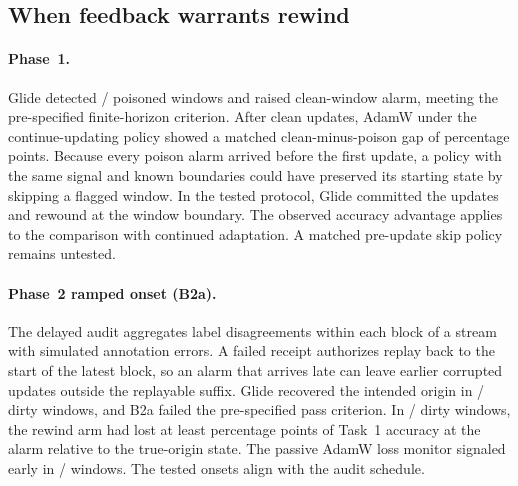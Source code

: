 \begin{table}[tbp]
  \centering\small
  \caption{Phase~1 numerical and learning results from the
  confirmatory replication. The retention contrasts use the paired first-task
  backward-transfer margin.}
  \label{tab:phaseone}
  
\end{table}

\subsection{When feedback warrants rewind}

\paragraph{Phase~1.}
Glide detected \PonePoisonsDetected{}/\PoneSeeds{} poisoned windows
and raised \PoneCleanAlarms{} clean-window alarm, meeting the
pre-specified finite-horizon criterion. After \PoneFollowup{}
clean updates, AdamW under the continue-updating policy showed a
matched clean-minus-poison gap of \PoneAdamGap{} percentage points.
Because every poison alarm arrived before the first update, a
policy with the same signal and known boundaries could have
preserved its starting state by skipping a flagged window.
In the tested protocol, Glide committed the updates and rewound
at the window boundary. The observed accuracy advantage applies to
the comparison with continued adaptation. A matched pre-update
skip policy remains untested.

\paragraph{Phase~2 ramped onset (B2a).}
The delayed audit aggregates label disagreements within each block
of a stream with simulated annotation errors. A failed receipt authorizes
replay back to the start of the latest block, so an alarm that
arrives late can leave earlier corrupted updates outside the
replayable suffix. Glide recovered the intended origin in
\PtwoRampRecovered{}/\PtwoSeeds{} dirty windows, and B2a failed
the pre-specified pass criterion. In
\PtwoRampDamaged{}/\PtwoSeeds{} dirty windows, the rewind arm had
lost at least \PtwoDamageThreshold{} percentage points of
Task~1 accuracy at the alarm relative to the true-origin state.
The passive AdamW loss monitor signaled early in
\PtwoRampEarly{}/\PtwoSeeds{} windows. The tested onsets align
with the audit schedule.

